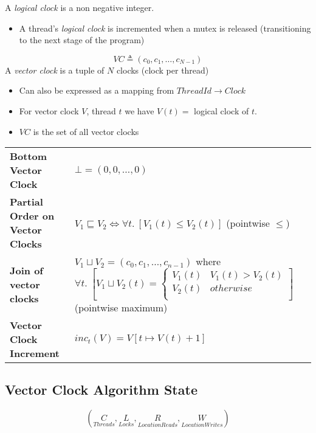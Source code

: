 A \textit{logical clock} is a non negative integer.
\begin{itemize}
	\item A thread's \textit{logical clock} is incremented when a mutex is released (transitioning to the next stage of the program)
\end{itemize}

\[VC \triangleq (c_0, c_1, \dots , c_{N-1})\]
A \textit{vector clock} is a tuple of $N$ clocks (clock per thread)
\begin{itemize}
	\item Can also be expressed as a mapping from $ThreadId \to Clock$
	\item For vector clock $V$, thread $t$ we have $V(t) =$ logical clock of $t$.
	\item $VC$ is the set of all vector clocks
\end{itemize}
\begin{center}
	\begin{tabular}{l p{}}
		\textbf{Bottom Vector Clock}            & $\bot = (0,0, \dots, 0)$                                                                                                                          \\
		\textbf{Partial Order on Vector Clocks} & $V_1 \sqsubseteq V_2 \Leftrightarrow \forall t . \ [V_1(t) \leq V_2(t)]$ (pointwise $\leq$)                                                       \\
		\textbf{Join of vector clocks}          & $V_1 \sqcup V_2 = (c_0, c_1, \dots, c_{n-1})$ where \newline $\forall t . \ [V_1 \sqcup V_2 (t) = \begin{cases}
				V_1(t) & V_1(t) > V_2(t) \\
				V_2(t) & otherwise       \\
			\end{cases}]$ (pointwise maximum) \\
		\textbf{Vector Clock Increment}         & $inc_t(V) = V[t \mapsto V(t) + 1]$
	\end{tabular}
\end{center}

\subsection{Vector Clock Algorithm State}
\[(\underset{Threads}{C}, \underset{Locks}{L}, \underset{Location Reads}{R}, \underset{Location Writes}{W})\]
